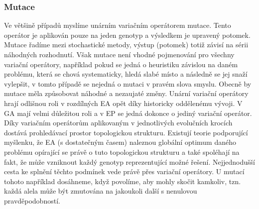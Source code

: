 \subsubsection{Mutace}
Ve většině případů myslíme unárním variačním operátorem mutace. Tento operátor je aplikován pouze na jeden genotyp a výsledkem je upravený potomek. Mutace řadíme mezi stochastické metody, výstup (potomek) totiž závisí na sérii náhodných rozhodnutí. Však mutace není vhodné pojmenování pro všechny variační operátory, například pokud se jedná o heuristiku závislou na daném problému, která se chová systematicky, hledá slabé místo a následně se jej snaží vylepšit, v tomto případě se nejedná o mutaci v pravém slova smyslu. Obecně by mutace měla způsobovat náhodné a nezaujaté změny. Unární variační operátory hrají odlišnou roli v rozdílných EA opět díky historicky oddělenému vývoji. V GA mají velmi důležitou roli a v EP se jedná dokonce o jediný variační operátor. Díky variačním operátorům aplikovaným v jednotlivých evolučních krocích dostává prohledávací prostor topologickou strukturu. Existují teorie podporující myšlenku, že EA (s dostatečným časem) naleznou globální optimum daného problému opírající se právě o tuto topologickou strukturu a také spoléhají na fakt, že může vzniknout každý genotyp reprezentující možné řešení. Nejjednodušší cesta ke splnění těchto podmínek vede právě přes variační operátory. U mutací tohoto například dosáhneme, když povolíme, aby mohly skočit kamkoliv, tzn. každá alela může být zmutována na jakoukoli další s nenulovou pravděpodobností.   

